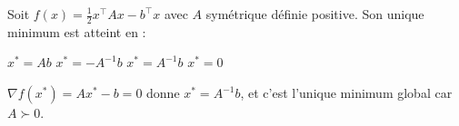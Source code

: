 \begin{question}
Soit $f(x)=\frac12x^{\top}Ax-b^{\top}x$ avec $A$ symétrique définie positive. Son unique minimum est atteint en :
\begin{reponses}
  \mauvaise $x^*=Ab$
  \mauvaise $x^*=-A^{-1}b$
  \bonne $x^*=A^{-1}b$
  \mauvaise $x^*=0$
\end{reponses}
\begin{explication}
$\nabla f(x^*)=Ax^*-b=0$ donne $x^*=A^{-1}b$, et c'est l'unique minimum global car $A\succ0$.
\end{explication}
\end{question}
